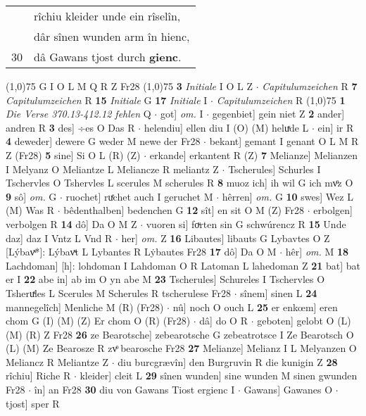 \documentclass[8pt,a4paper,notitlepage]{article}
\begin{document}
\begin{table}[ht]
\begin{minipage}[t]{0.5\linewidth}
\begin{tabular}{rl}
 & rîchiu kleider unde ein rîselîn,\\ 
 & dâr sînen wunden arm în hienc,\\ 
30 & dâ Gawans tjost durch \textbf{gienc}.\\ 
\end{tabular}
\scriptsize
\line(1,0){75} \newline
G I O L M Q R Z Fr28 \newline
\line(1,0){75} \newline
\textbf{3} \textit{Initiale} I O L Z   $\cdot$ \textit{Capitulumzeichen} R  \textbf{7} \textit{Capitulumzeichen} R  \textbf{15} \textit{Initiale} G  \textbf{17} \textit{Initiale} I   $\cdot$ \textit{Capitulumzeichen} R  \newline
\line(1,0){75} \newline
\textbf{1} \textit{Die Verse 370.13-412.12 fehlen} Q   $\cdot$ got] \textit{om.} I  $\cdot$ gegenbiet] gein niet Z \textbf{2} ander] andren R \textbf{3} des] ÷es O Das R  $\cdot$ helendiu] ellen diu I (O) (M) heluͯde L  $\cdot$ ein] ir R \textbf{4} deweder] dewere G weder M newe der Fr28  $\cdot$ bekant] gemant I genant O L M R Z (Fr28) \textbf{5} sine] Si O L (R) (Z)  $\cdot$ erkande] erkantent R (Z) \textbf{7} Melianze] Melianzen I Melyanz O Meliantze L Meliancze R meliantz Z  $\cdot$ Tscherules] Schurles I Tschervles O Tshervles L scerules M scherules R \textbf{8} muoz ich] ih wil G ich mvͦz O \textbf{9} sô] \textit{om.} G  $\cdot$ ruochet] ruͤchet auch I geruchet M  $\cdot$ hêrren] \textit{om.} G \textbf{10} swes] Wez L (M) Was R  $\cdot$ bêdenthalben] bedenchen G \textbf{12} sît] en sit O M (Z) Fr28  $\cdot$ erbolgen] verbolgen R \textbf{14} dô] Da O M Z  $\cdot$ vuoren si] foͮrten sin G schwúrencz R \textbf{15} Unde daz] daz I Vntz L Vnd R  $\cdot$ her] \textit{om.} Z \textbf{16} Libautes] libauts G Lybavtes O Z [Lýbavͯ*]: Lýbavͯt L Lybantes R Lẏbautes Fr28 \textbf{17} dô] Da O M  $\cdot$ hêr] \textit{om.} M \textbf{18} Lachdoman] [h]: lohdoman I Lahdoman O R Latoman L lahedoman Z \textbf{21} bat] bat er I \textbf{22} abe in] ab im O yn abe M \textbf{23} Tscherules] Schureles I Tschervles O Tsheruͯles L Scerules M Scherules R tscherulese Fr28  $\cdot$ sînem] sinen L \textbf{24} mannegelîch] Menliche M (R) (Fr28)  $\cdot$ nû] noch O ouch L \textbf{25} er enkœm] eren chom G (I) (M) (Z) Er chom O (R) (Fr28)  $\cdot$ dâ] do O R  $\cdot$ geboten] gelobt O (L) (M) (R) Z Fr28 \textbf{26} ze Bearotsche] zebearotsche G zebeatrotsce I Ze Bearotsch O (L) (M) Ze Bearosze R zvͦ bearosche Fr28 \textbf{27} Melianze] Melianz I L Melyanzen O Meliancz R Meliantze Z  $\cdot$ diu burcgrævîn] den Burgruvin R die kunigin Z \textbf{28} rîchiu] Riche R  $\cdot$ kleider] cleit L \textbf{29} sînen wunden] sine wunden M sinen gwunden Fr28  $\cdot$ în] an Fr28 \textbf{30} diu von Gawans Tiost ergienc I  $\cdot$ Gawans] Gawanes O  $\cdot$ tjost] sper R \newline

\end{minipage}
\end{table}
\end{document}

